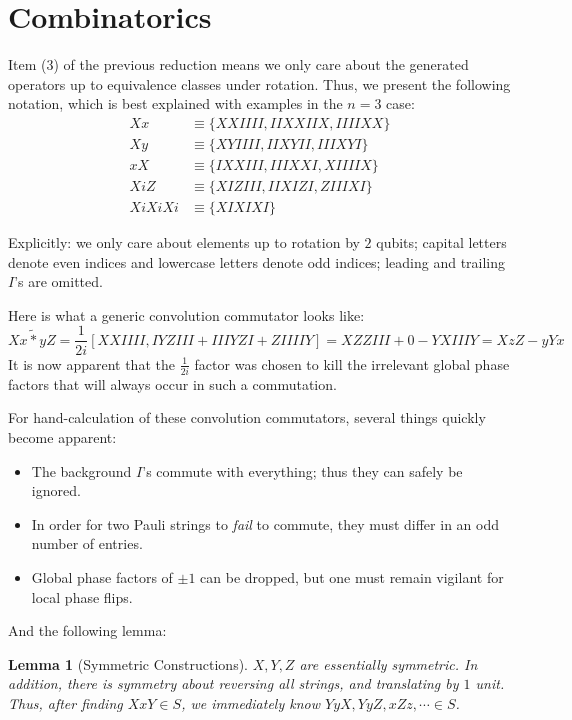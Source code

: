 \documentclass[fleqn,12pt]{article}
\newcommand{\ts}{\tilde{*}}
\newtheorem{lemma}{Lemma}
\begin{document}
\section{Combinatorics}

Item (3) of the previous reduction means we only care about
the generated operators up to equivalence classes under rotation. Thus, we present
the following notation, which is best explained with examples in the $n = 3$
case:
\begin{align*}
    Xx     & \equiv \{ XXIIII, IIXXIIX, IIIIXX \} \\
    Xy     & \equiv \{ XYIIII, IIXYII, IIIXYI \}  \\
    xX     & \equiv \{ IXXIII, IIIXXI, XIIIIX \}  \\
    XiZ    & \equiv \{ XIZIII, IIXIZI, ZIIIXI \}  \\
    XiXiXi & \equiv \{ XIXIXI\}
\end{align*}

Explicitly: we only care about elements up to rotation by $2$ qubits;
capital letters denote even indices and lowercase letters denote odd indices;
leading and trailing $I$'s are omitted.

Here is what a generic convolution commutator looks like:
\[
    Xx \ts yZ = \frac{1}{2i}[XXIIII, IYZIII + IIIYZI + ZIIIIY] = XZZIII + 0 - YXIIIY = XzZ - yYx
\]
It is now apparent that the $\frac1{2i}$ factor was chosen to kill the
irrelevant global phase factors that will always occur in such a commutation.

For hand-calculation of these convolution commutators, several things quickly
become apparent:
\begin{itemize}
    \item The background $I$'s commute with everything;
          thus they can safely be ignored.
    \item In order for two Pauli strings to \emph{fail} to commute,
          they must differ in an odd number of entries.
    \item Global phase factors of $\pm 1$ can be dropped, but one must
          remain vigilant for local phase flips.
\end{itemize}
And the following lemma:
\begin{lemma}
    [Symmetric Constructions]
    $X, Y, Z$ are essentially symmetric. In addition, there is
    symmetry about reversing all strings, and translating by $1$ unit.
    Thus, after finding $XxY\in S$, we immediately know
    $YyX, YyZ, xZz, \cdots \in S$.
\end{lemma}
\end{document}
